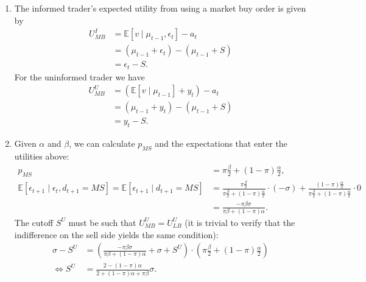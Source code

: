 \documentclass[a4paper]{article}
\begin{document}
\begin{enumerate}
	\item The informed trader's expected utility from using a market buy order is given by
	\begin{align}
		U^I_{MB}
		&= \mathbb{E}[v \mid \mu_{t-1},\epsilon_{t}] - a_t 
		\nonumber
		\\
		&= (\mu_{t-1} + \epsilon_t) - (\mu_{t-1} + S)
		\nonumber
		\\
		&= \epsilon_t - S.
		\label{eq:uimb}
	\end{align}
	For the uninformed trader we have
	\begin{align}
		U^U_{MB}
		&= (\mathbb{E}[v \mid \mu_{t-1}] + y_t) - a_t 
		\nonumber
		\\
		&= (\mu_{t-1} + y_t) - (\mu_{t-1} + S)
		\nonumber
		\\
		&= y_t - S.
		\label{eq:uumb}
	\end{align}
	
	\item Given $\alpha$ and $\beta$, we can calculate $p_{MS}$ and the expectations that enter the utilities above:
	\begin{align*}
		p_{MS} &= \pi \frac{\beta}{2} + (1-\pi) \frac{\alpha}{2},
		\\
		\mathbb{E}[\epsilon_{t+1} \mid \epsilon_t, d_{t+1}=MS] = \mathbb{E}[\epsilon_{t+1} \mid d_{t+1}=MS] &= \frac{\pi \frac{\beta}{2}}{\pi \frac{\beta}{2} + (1-\pi) \frac{\alpha}{2}} \cdot (-\sigma) + \frac{(1-\pi) \frac{\alpha}{2}}{\pi \frac{\beta}{2} + (1-\pi) \frac{\alpha}{2}} \cdot 0
		\\
		&= \frac{-\pi \beta \sigma}{\pi \beta + (1-\pi) \alpha}.
	\end{align*}
	The cutoff $S^U$ must be such that $U^U_{MB} = U^U_{LB}$ (it is trivial to verify that the indifference on the sell side yields the same condition):
	\begin{align*}
		\sigma - S^U &= \left( \frac{-\pi \beta \sigma}{\pi \beta + (1-\pi) \alpha} + \sigma + S^U \right) \cdot \left(\pi \frac{\beta}{2} + (1-\pi) \frac{\alpha}{2}\right)
		\\
		\iff 
		S^U &= \frac{2-(1-\pi)\alpha}{2 + (1-\pi)\alpha + \pi \beta} \sigma.
	\end{align*}
	

\end{enumerate}
\end{document}
